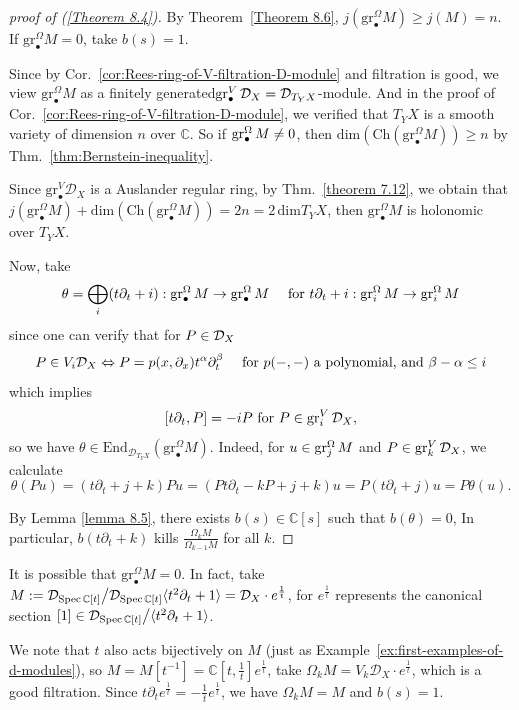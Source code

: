 \begin{proof}[proof of (\ref{Theorem 8.4})]
    \quad

    By Theorem~\ref{Theorem 8.6},
    $j(\mathrm{gr}_{\bullet}^\Omega M)\ge j(M)=n$.
    If $\mathrm{gr}_{\bullet}^\Omega M=0$, take $b(s)=1$.

    Since by Cor.~\ref{cor:Rees-ring-of-V-filtration-D-module} and filtration is good, we view $\mathrm{gr}_{\bullet}^\Omega M$ as a finitely generated$\operatorname{gr}_\bullet^{V}\mathcal{D}_X = \mathcal{D}_{T_Y X}$-module.
    And in the proof of Cor.~\ref{cor:Rees-ring-of-V-filtration-D-module}, we verified that $T_{Y}X$ is a smooth variety of dimension $n$ over $\mathbb{C}$.
    So if $\operatorname{gr}_\bullet^{\Omega}M \neq 0$, then $\mathrm{dim}(\mathrm{Ch}(\mathrm{gr}^\Omega_{\bullet}M))\ge n$ by Thm.~\ref{thm:Bernstein-inequality}.

    Since $\mathrm{gr}_{\bullet}^V\mathcal{D}_{X}$ is a Auslander regular ring,
    by Thm.~\ref{theorem 7.12},
    we obtain that $j(\mathrm{gr}_{\bullet}^\Omega M)+\mathrm{dim}(\mathrm{Ch}(\mathrm{gr}_{\bullet}^\Omega M))=2n=2\,\mathrm{dim}T_{Y}X$, then $\mathrm{gr}^\Omega_{\bullet} M$ is holonomic over $T_Y X$.

    Now, take
    \[\theta=\bigoplus \limits_{i}(t\partial_{t}+i) : \operatorname{gr}_\bullet^\Omega M \to \operatorname{gr}_\bullet^\Omega M\quad \text{ for } t\partial_t + i: \operatorname{gr}_i^\Omega M \to \operatorname{gr}_i^\Omega M\]
    since one can verify that for $P\in\mathcal{D}_X$
    \[P \in V_{i}\mathcal{D}_X \Leftrightarrow P = p(x,\partial_x) t^{\alpha}\partial_t^\beta\quad \text{ for } p(-,-) \text{ a polynomial, and }\beta - \alpha \le i\]
    which implies
    \[[t\partial_t, P] = -i P \text{ for } P\in\operatorname{gr}_i^{V}\mathcal{D}_X,\]
    so we have $\theta\in\mathrm{End}_{\mathcal{D}_{T_{Y}X}}(\mathrm{gr}_{\bullet}^\Omega M)$.
    Indeed, for $u \in \operatorname{gr}_j^\Omega M$ and $P \in \operatorname{gr}_k^{V} \mathcal{D}_X$, we calculate
    \[
        \theta(Pu) = (t\partial_t + j + k) Pu = (P t\partial_t - k P + j + k) u = P(t\partial_t + j) u = P \theta(u).
    \]

    By Lemma \ref{lemma 8.5}, there exists $b(s)\in\mathbb{C}[s]$ such that $b(\theta)=0$,
    In particular, $b(t\partial_{t}+k)$ kills $\frac{\Omega_{k}M}{\Omega_{k-1}M}$ for all $k$.
\end{proof}

\begin{remark}\label{rmk:b_function_of_C[x,1/x]e^1/x}
    It is possible that $\mathrm{gr}_{\bullet}^\Omega M=0$. In fact, take
    $M := \mathcal{D}_{\operatorname{Spec}{\mathbb{C}[t]}} \big/ \mathcal{D}_{\operatorname{Spec}{\mathbb{C}[t]}}\langle t^2\partial_t + 1 \rangle = \mathcal{D}_{X}\cdot e^{\frac{1}{t}}$,
    for $e^{\frac{1}{t}}$ represents the canonical section $[1]\in\mathcal{D}_{\operatorname{Spec}{\mathbb{C}[t]}} \big/ \langle t^2\partial_t + 1 \rangle$.

    We note that $t$ also acts bijectively on $M$ (just as Example~\ref{ex:first-examples-of-d-modules}),
    so $M=M[t^{-1}]  = \mathbb{C}[t, \frac{1}{t}]e^{\frac{1}{t}}$,
    take $\Omega_{k}M=V_{k}\mathcal{D}_{X}\cdot e^{\frac{1}{t}}$,
    which is a good filtration.
    Since $t\partial_{t}e^{\frac{1}{t}}= -\frac{1}{t} e^{\frac{1}{t}}$, we have $\Omega_{k}M=M$ and $b(s)=1$.
\end{remark}

